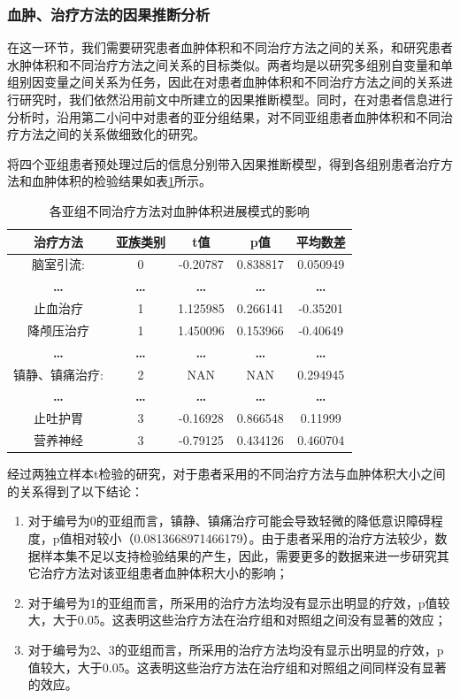 \documentclass[bwprint]{gmcmthesis}
\begin{document}
\subsubsection{血肿、治疗方法的因果推断分析}
在这一环节，我们需要研究患者血肿体积和不同治疗方法之间的关系，和研究患者水肿体积和不同治疗方法之间关系的目标类似。两者均是以研究多组别自变量和单组别因变量之间关系为任务，因此在对患者血肿体积和不同治疗方法之间的关系进行研究时，我们依然沿用前文中所建立的因果推断模型。同时，在对患者信息进行分析时，沿用第二小问中对患者的亚分组结果，对不同亚组患者血肿体积和不同治疗方法之间的关系做细致化的研究。

将四个亚组患者预处理过后的信息分别带入因果推断模型，得到各组别患者治疗方法和血肿体积的检验结果如表\ref{tab:各亚组不同治疗方法血肿}所示。
\begin{table}[ht]
\centering
\caption{各亚组不同治疗方法对血肿体积进展模式的影响}
\label{tab:各亚组不同治疗方法血肿}
\fontsize{11}{9}\selectfont
\renewcommand\tabcolsep{6pt}
{
\begin{tabular}{ccccc}
\toprule[1.2pt]
治疗方法       & 亚族类别       & t值         & p值         & 平均数差       \\ \midrule
脑室引流:      & 0          & -0.20787   & 0.838817   & 0.050949   \\
\textbf{…} & \textbf{…} & \textbf{…} & \textbf{…} & \textbf{…} \\
止血治疗       & 1          & 1.125985   & 0.266141   & -0.35201   \\
降颅压治疗      & 1          & 1.450096   & 0.153966   & -0.40649   \\
\textbf{…} & \textbf{…} & \textbf{…} & \textbf{…} & \textbf{…} \\
镇静、镇痛治疗:   & 2          & NAN        & NAN        & 0.294945   \\
\textbf{…} & \textbf{…} & \textbf{…} & \textbf{…} & \textbf{…} \\
止吐护胃       & 3          & -0.16928   & 0.866548   & 0.11999    \\
营养神经       & 3          & -0.79125   & 0.434126   & 0.460704   \\ \bottomrule[1.2pt]
\end{tabular}}
\end{table}

经过两独立样本t检验的研究，对于患者采用的不同治疗方法与血肿体积大小之间的关系得到了以下结论：



\begin{enumerate}
    \item 对于编号为0的亚组而言，镇静、镇痛治疗可能会导致轻微的降低意识障碍程度，p值相对较小（0.0813668971466179）。由于患者采用的治疗方法较少，数据样本集不足以支持检验结果的产生，因此，需要更多的数据来进一步研究其它治疗方法对该亚组患者血肿体积大小的影响；
    \item 对于编号为1的亚组而言，所采用的治疗方法均没有显示出明显的疗效，p值较大，大于0.05。这表明这些治疗方法在治疗组和对照组之间没有显著的效应；
    \item 对于编号为2、3的亚组而言，所采用的治疗方法均没有显示出明显的疗效，p值较大，大于0.05。这表明这些治疗方法在治疗组和对照组之间同样没有显著的效应。

\end{enumerate}
\end{document}
